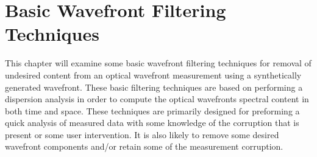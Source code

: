 
\chapter{Basic Wavefront Filtering Techniques}
\label{chap:wavefront_filtering}
This chapter will examine some basic wavefront filtering techniques for removal of undesired content from an optical wavefront measurement using a synthetically generated wavefront.
These basic filtering techniques are based on performing a dispersion analysis in order to compute the optical wavefronts spectral content in both time and space.
These techniques are primarily designed for preforming a quick analysis of measured data with some knowledge of the corruption that is present or some user intervention.
It is also likely to remove some desired wavefront components and/or retain some of the measurement corruption.

